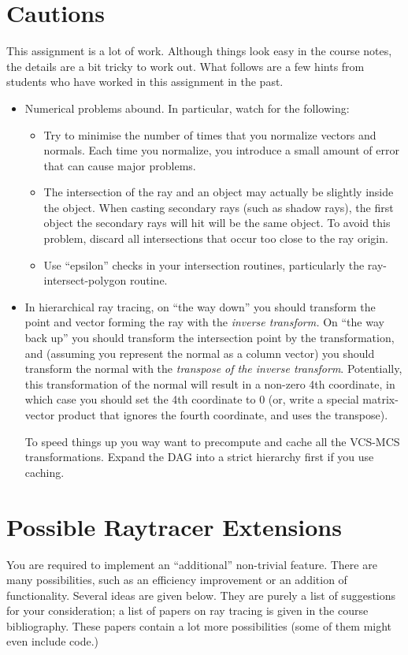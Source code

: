 \section{Cautions}
This assignment is a lot of work.  Although things look easy
in the course notes, the details are a bit tricky to work out.
What follows are a few hints from students who have worked in
this assignment in the past.
\begin{itemize}
	\item Numerical problems abound.  In particular, watch
		for the following:
	\begin{itemize}
		\item Try to minimise the number of times that 
			you normalize vectors and normals.  
			Each time you normalize, you introduce
			a small amount of error that can cause
			major problems.
		\item The intersection of the ray and an object
			may actually be slightly inside the object.
			When casting secondary rays (such as shadow
			rays), the first object the secondary rays
			will hit will be the same object.  To
			avoid this problem, discard all intersections
			that occur too close to the ray origin.
		\item Use ``epsilon'' checks in your intersection
			routines, particularly the ray-intersect-polygon
			routine.
	\end{itemize}
	\item In hierarchical ray tracing, on ``the way down''
		you should transform the point and vector forming
		the ray with the {\it inverse transform.}  On
		``the way back up'' you should transform the
		intersection point by the transformation, and
		(assuming you represent the normal as a column
		vector) you should transform the normal with
		the {\it transpose of the inverse transform}.
		Potentially, this transformation of the normal
		will result in a non-zero 4th coordinate, in
		which case you should set the 4th coordinate
		to 0 (or, write a special matrix-vector product
                that ignores the fourth coordinate, and uses the
		transpose).

                To speed things up you way want to precompute and
                cache all the VCS-MCS transformations.
                Expand the DAG into a strict
                hierarchy first if you use caching.
\end{itemize}

\section{Possible Raytracer Extensions}
You are required to implement an ``additional'' non-trivial feature.
There are many possibilities, such as an
efficiency improvement or an addition of functionality.  Several ideas
are given below.
They are purely a list of suggestions for your
consideration; a list of papers on ray tracing is given in the
course bibliography.
These papers contain a lot more possibilities
(some of them might even include code.)

